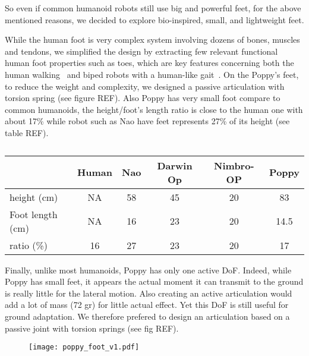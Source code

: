 So even if common humanoid robots still use big and powerful feet, for the above mentioned reasons, we decided to explore bio-inspired, small, and lightweight feet.

While the human foot is very complex system involving dozens of bones, muscles and tendons, we simplified the design by extracting few relevant functional human foot properties such as toes, which are key features concerning both the human walking~\cite{Hughes1990} and biped robots with a human-like gait~\cite{Sellaouti2006}. On the Poppy's feet, to reduce the weight and complexity, we designed a passive articulation with torsion spring (see figure REF).
Also Poppy has very small foot compare to common humanoids, the height/foot's length ratio is close to the human one with about 17\% while robot such as Nao have feet represents 27\% of its height (see table REF).

\begin{table}[ht]
\centering
\begin{tabular}{l| c c c c c}
    & Human & Nao & Darwin Op & Nimbro-OP & Poppy \\
    \hline
    height (cm) & NA & 58 & 45 & 20 & 83\\
    Foot length (cm) & NA & 16 & 23 & 20 & 14.5\\
    ratio (\%) & 16 & 27 & 23 & 20 & 17\\
\end{tabular}
\caption{}
\label{tab:poppy_feet_compare}
\end{table}

Finally, unlike most humanoids, Poppy has only one active DoF. Indeed, while Poppy has small feet, it appears the actual moment it can transmit to the ground is really little for the lateral motion. Also creating an active articulation would add a lot of mass (72 gr) for little actual effect. Yet this DoF is still useful for ground adaptation. We therefore prefered to design an articulation based on a passive joint with torsion springs (see fig REF).






\begin{figure}[p]
    \begin{center}
        \texttt{[image: poppy\_foot\_v1.pdf]}
    \end{center}
    \caption{}
    \label{fig:poppy-foot-v1-design}
\end{figure}


